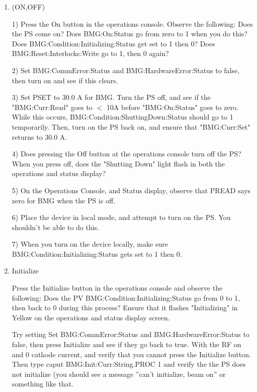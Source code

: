 \documentclass[11pt]{book}		%
\begin{document}
\begin{enumerate}

 \item (ON,OFF)

\color{red}
1) Press the On button in the operations console. Observe the following: 
	Does the PS come on? 
	Does BMG:On:Status go from zero to 1 when you do this? 
	Does BMG:Condition:Initializing:Status get set to 1 then 0?
	Does BMG:Reset:Interlocks:Write go to 1, then 0 again?

2) Set BMG:CommError:Status and BMG:HardwareError:Status to false, then turn on and see if this clears.

3) Set PSET to 30.0 A for BMG. Turn the PS off, and see if the "BMG:Curr:Read" goes to $<$ 10A before "BMG:On:Status" goes to zero. While this occurs, BMG:Condition:ShuttingDown:Status should go to 1 temporarily. Then, turn on the PS back on, and ensure that "BMG:Curr:Set" returns to 30.0 A.

4) Does pressing the Off button at the operations console turn off the PS? When you press off, does the "Shutting Down" light flash in both the operations and status display?

5) On the Operations Console, and Status display, observe that PREAD says zero for BMG when the PS is off.

6) Place the device in local mode, and attempt to turn on the PS. You shouldn't be able to do this.

7) When you turn on the device locally, make sure BMG:Condition:Initializing:Status gets set to 1 then 0.


\color{black}

 \item Initialize

\color{red}

Press the Initialize button in the operations console and observe the following:
	Does the PV BMG:Condition:Initializing:Status go from 0 to 1, then back to 0 during this process? 
	Ensure that it flashes "Initializing" in Yellow on the operations and status display screen. 

Try setting Set BMG:CommError:Status and BMG:HardwareError:Status to false, then press Initialize and see if they go back to true.
With the RF on and 0 cathode current, and verify that you cannot press the Initialize button. Then type caput BMG:Init:Curr:String.PROC 1 and verify the the PS does not initialize (you should see a message ''can't initialize, beam on'' or something like that.


\end{enumerate}
\end{document}
